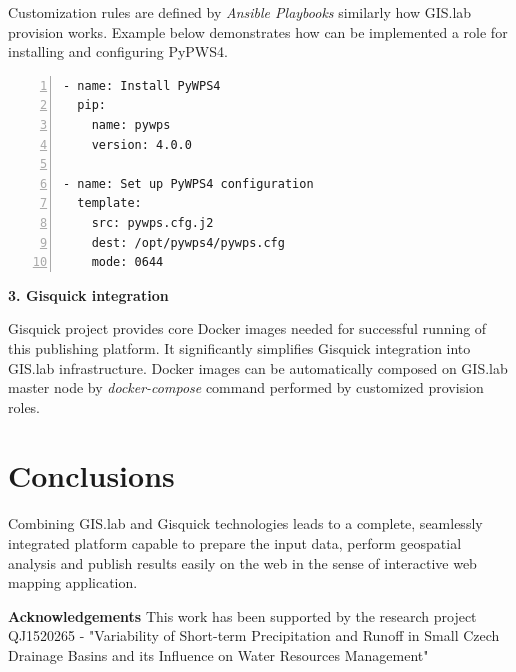 \documentclass{tudelftposter}
\begin{document}
Customization rules are defined by \textit{Ansible Playbooks}
similarly how GIS.lab provision works. Example below demonstrates how
can be implemented a role for installing and configuring PyPWS4.

\begin{lstlisting}[numbers=left,xleftmargin=1em]
- name: Install PyWPS4
  pip:
    name: pywps
    version: 4.0.0

- name: Set up PyWPS4 configuration
  template:
    src: pywps.cfg.j2
    dest: /opt/pywps4/pywps.cfg
    mode: 0644
\end{lstlisting}

\vskip 0.1in

\textbf{3. Gisquick integration}

Gisquick project provides core Docker images needed for successful
running of this publishing platform. It significantly simplifies
Gisquick integration into GIS.lab infrastructure. Docker images can be
automatically composed on GIS.lab master node by
\textit{docker-compose} command performed by customized provision
roles.

\section{Conclusions}

Combining GIS.lab and Gisquick technologies leads to a complete, seamlessly
integrated platform capable to prepare the input data, perform geospatial
analysis and publish results easily on the web in the sense of interactive
web mapping application.

{\footnotesize \textbf{Acknowledgements} This work has been supported by the research
project QJ1520265 - "Variability of Short-term Precipitation and
Runoff in Small Czech Drainage Basins and its Influence on Water
Resources Management"}
\end{document}
